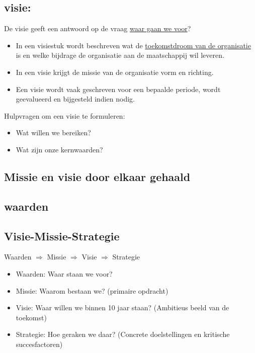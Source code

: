 \documentclass[12pt]{article}
\begin{document}
\subsection{visie:}
De visie geeft een antwoord op de vraag \underline{waar gaan we voor}?
\begin{itemize}
    \item In een visiestuk wordt beschreven wat de \underline{toekomstdroom van de organisatie} is en welke bijdrage de organisatie aan de maatschappij wil leveren.
    \item In een visie krijgt de missie van de organisatie vorm en richting.
    \item Een visie wordt vaak geschreven voor een bepaalde periode, wordt geevalueerd en bijgesteld indien nodig.
\end{itemize}
Hulpvragen om een visie te formuleren:\begin{itemize}
    \item Wat willen we bereiken?
    \item Wat zijn onze kernwaarden?
\end{itemize}
\subsection{Missie en visie door elkaar gehaald}
\subsection{waarden}
\subsection{Visie-Missie-Strategie}
Waarden $\Rightarrow$ Missie $\Rightarrow$ Visie $\Rightarrow$ Strategie
\begin{itemize}
    \item Waarden: Waar staan we voor?
    \item Missie: Waarom bestaan we? (primaire opdracht)
    \item Visie: Waar willen we binnen 10 jaar staan? (Ambitieus beeld van de toekomst)
    \item Strategie: Hoe geraken we daar? (Concrete doelstellingen en kritische succesfactoren)
\end{itemize}
\end{document}
